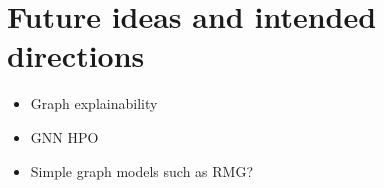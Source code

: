 \chapter{Future ideas and intended directions}
\label{chap:future}

\begin{itemize}
	\item Graph explainability
	\item GNN HPO
	\item Simple graph models such as RMG?
\end{itemize}
